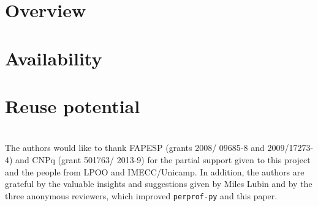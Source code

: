 \documentclass{jors}
\begin{document}

\section{Overview}


\section{Availability}


\section{Reuse potential}



\section*{}
The authors would like to thank FAPESP 
(grants 2008/ 09685-8 and 2009/17273-4) and CNPq (grant 501763/ 2013-9) for the
partial support given to this project
and the people from LPOO and IMECC/Unicamp.
In addition, the authors are grateful by the valuable insights and suggestions 
given by Miles Lubin and by the three anonymous reviewers, which  improved
{\tt perprof-py} and this paper.

\printbibliography
\end{document}
